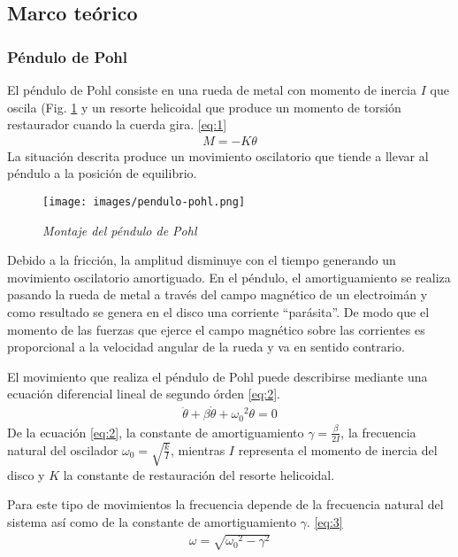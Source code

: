 \documentclass[spanish,notitlepage,letterpaper, 12pt]{article}
\begin{document}
\subsection{Marco teórico} \label{I.MT}
\subsubsection{Péndulo de Pohl}
El péndulo de Pohl consiste en una rueda de metal con momento de inercia $I$ que
oscila (Fig. \ref{fig:1} y un resorte helicoidal que produce un momento de torsión restaurador cuando la cuerda gira. \eqref{eq:1}
\begin{align}\label{eq:1}
    M=-K\theta
\end{align}
La situación descrita produce un movimiento oscilatorio que tiende a llevar al péndulo a la posición de equilibrio.
\newpage
\begin{figure}[ht]
    \centering
    \texttt{[image: images/pendulo-pohl.png]}
    \caption{\textit{Montaje del péndulo de Pohl}}
    \label{fig:1}
\end{figure}
Debido a la fricción, la amplitud disminuye con el tiempo generando un movimiento oscilatorio amortiguado. En el péndulo, el amortiguamiento se realiza pasando la rueda de metal a través del campo magnético de un electroimán y como resultado se genera en el disco una corriente ``parásita''. De modo
que el momento de las fuerzas que ejerce el campo magnético sobre las corrientes es proporcional a la velocidad angular de la rueda y va en sentido contrario.\par
\bigskip
El movimiento que realiza el péndulo de Pohl puede describirse mediante una ecuación diferencial lineal de segundo órden \eqref{eq:2}. \cite{serway_jewett_2017}
\begin{align}\label{eq:2}
    \ddot{\theta}+\beta\dot{\theta}+{\omega_0}^2\theta=0
\end{align}
De la ecuación \eqref{eq:2}, la constante de amortiguamiento $\gamma=\frac{\beta}{2I}$, la frecuencia natural del oscilador $\omega_0=\sqrt{\frac{k}{I}}$, mientras $I$ representa el momento de inercia del disco y $K$ la constante de restauración del resorte helicoidal.\par
\bigskip
Para este tipo de movimientos la frecuencia depende de la frecuencia natural del sistema así como de la constante de amortiguamiento $\gamma$. \eqref{eq:3}
\begin{align}\label{eq:3}
    \omega=\sqrt{{\omega_0}^2-\gamma^2}
\end{align}
\end{document}
